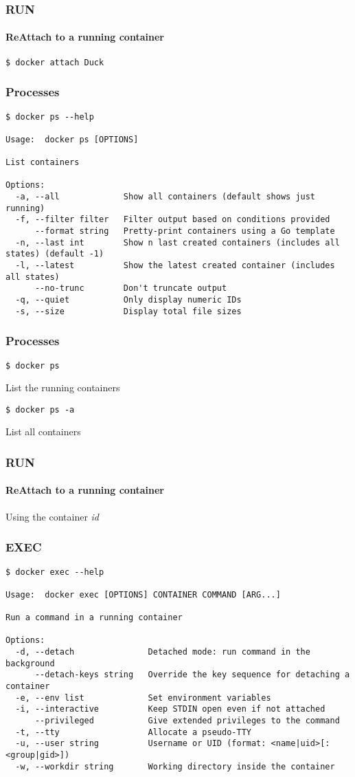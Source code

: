 \begin{frame}[fragile]
\frametitle{RUN}
\framesubtitle{ReAttach to a running container}
\begin{lstlisting}
$ docker attach Duck
\end{lstlisting}
\end{frame}

\begin{frame}[fragile]
\frametitle{Processes}
\scriptsize
\begin{lstlisting}[breaklines=true]
$ docker ps --help

Usage:  docker ps [OPTIONS]

List containers

Options:
  -a, --all             Show all containers (default shows just running)
  -f, --filter filter   Filter output based on conditions provided
      --format string   Pretty-print containers using a Go template
  -n, --last int        Show n last created containers (includes all states) (default -1)
  -l, --latest          Show the latest created container (includes all states)
      --no-trunc        Don't truncate output
  -q, --quiet           Only display numeric IDs
  -s, --size            Display total file sizes
\end{lstlisting}
\normalsize
\end{frame}

\begin{frame}[fragile]
\frametitle{Processes}
\begin{lstlisting}
$ docker ps
\end{lstlisting}
List the running containers 
\begin{lstlisting}
$ docker ps -a
\end{lstlisting}
List all containers 
\end{frame}


\begin{frame}[fragile]
\frametitle{RUN}
\framesubtitle{ReAttach to a running container}
Using the container \textit{id}
\end{frame}


\begin{frame}[fragile]
\frametitle{EXEC}
\scriptsize
\begin{lstlisting}[breaklines=true]
$ docker exec --help

Usage:  docker exec [OPTIONS] CONTAINER COMMAND [ARG...]

Run a command in a running container

Options:
  -d, --detach               Detached mode: run command in the background
      --detach-keys string   Override the key sequence for detaching a container
  -e, --env list             Set environment variables
  -i, --interactive          Keep STDIN open even if not attached
      --privileged           Give extended privileges to the command
  -t, --tty                  Allocate a pseudo-TTY
  -u, --user string          Username or UID (format: <name|uid>[:<group|gid>])
  -w, --workdir string       Working directory inside the container
\end{lstlisting}
\normalsize
\end{frame}

